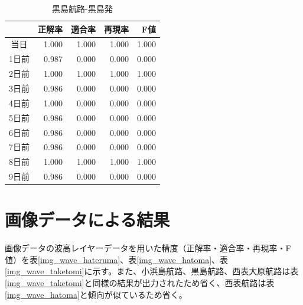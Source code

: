 \documentclass[twocolumn,twoside,9.5pt]{jsarticle}
\begin{document}
\begin{table}[H]
  \begin{center}
    \caption{黒島航路-黒島発}
    \begin{tabular}{|c|r|r|r|r|} \hline
   &正解率 & 適合率 & 再現率 & F値 \\ \hline
      当日 & 1.000 & 1.000 & 1.000 & 1.000 \\ \hline
     1日前 & 0.987 & 0.000& 0.000 & 0.000 \\ \hline
      2日前 & 1.000 & 1.000 & 1.000 & 1.000 \\ \hline
      3日前 & 0.986 & 0.000 & 0.000 & 0.000 \\ \hline 
      4日前 & 1.000 & 0.000 & 0.000 & 0.000 \\ \hline 
      5日前 & 0.986 & 0.000 & 0.000 & 0.000 \\ \hline 
      6日前 & 0.986 & 0.000 & 0.000 & 0.000 \\ \hline 
      7日前 & 0.986 & 0.000 & 0.000 & 0.000 \\ \hline 
      8日前 & 1.000 & 1.000 & 1.000 & 1.000 \\ \hline 
      9日前 & 0.986 & 0.000 & 0.000 & 0.000 \\ \hline 
    \end{tabular}    
    \label{value_kurosima}
  \end{center}
\end{table}

\section{画像データによる結果}
画像データの波高レイヤーデータを用いた精度（正解率・適合率・再現率・F値）を表\ref{img_wave_hateruma}、表\ref{img_wave_hatoma}、表\ref{img_wave_taketomi}に示す。また、小浜島航路、黒島航路、西表大原航路は表\ref{img_wave_taketomi}と同様の結果が出力されたため省く、西表航路は表\ref{img_wave_hatoma}と傾向が似ているため省く。
\end{document}
